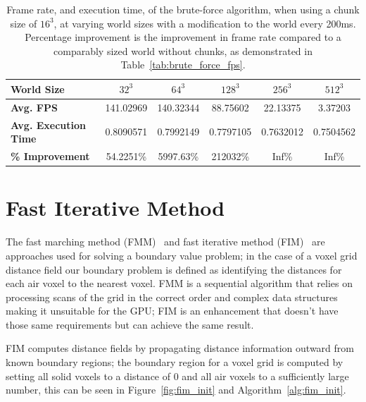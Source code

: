 \begin{table}[h!]
    \centering
    \vspace{0.5em}
    \begin{tabular}{l|*{5}{c}}
        \toprule
        \textbf{World Size}          & \textbf{\(32^3\)} & \textbf{\(64^3\)} & \textbf{\(128^3\)} & \textbf{\(256^3\)} & \textbf{\(512^3\)} \\
        \midrule
        \textbf{Avg. FPS}            & 141.02969         & 140.32344         & 88.75602           & 22.13375           & 3.37203            \\
        \textbf{Avg. Execution Time} & 0.8090571         & 0.7992149         & 0.7797105          & 0.7632012          & 0.7504562          \\
        \textbf{\% Improvement}      & 54.2251\%         & 5997.63\%         & 212032\%           & Inf\%              & Inf\%              \\
        \bottomrule
    \end{tabular}
    \caption{Frame rate, and execution time, of the brute-force algorithm, when using a chunk size of \(16^3\), at
        varying world sizes with a modification to the world every 200ms. Percentage improvement is the improvement in
        frame rate compared to a comparably sized world without chunks, as demonstrated in Table~\ref{tab:brute_force_fps}.}
    \label{tab:chunks_perf}
\end{table}

\FloatBarrier

\section{Fast Iterative Method} \label{sec:fim}
The fast marching method (FMM)~\cite{sethian1999fast} and fast iterative method (FIM)~\cite{jeong2008fast} are
approaches used for solving a boundary value problem; in the case of a voxel grid distance field our boundary problem is
defined as identifying the distances for each air voxel to the nearest voxel. FMM is a sequential algorithm that relies
on processing scans of the grid in the correct order and complex data structures making it unsuitable for the GPU; FIM
is an enhancement that doesn't have those same requirements but can achieve the same result.

FIM computes distance fields by propagating distance information outward from known boundary regions; the boundary
region for a voxel grid is computed by setting all solid voxels to a distance of 0 and all air voxels to a sufficiently
large number, this can be seen in Figure~\ref{fig:fim_init} and Algorithm~\ref{alg:fim_init}.

